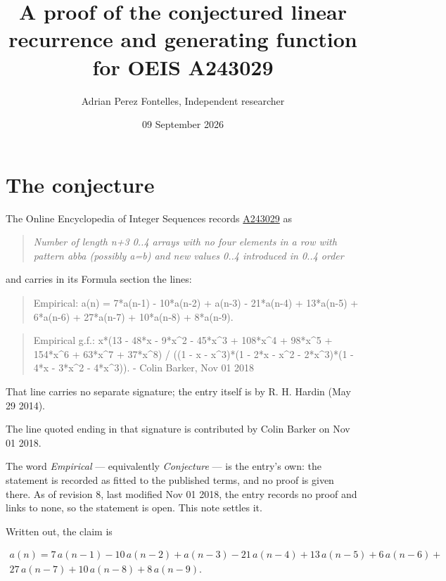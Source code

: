 \documentclass[11pt]{article}
\title{A proof of the conjectured linear recurrence and generating function for OEIS A243029}
\author{Adrian Perez Fontelles, Independent researcher}
\date{09 September 2026}
\theoremstyle{definition}
\begin{document}
\maketitle
\section{The conjecture}

The Online Encyclopedia of Integer Sequences records \href{https://oeis.org/A243029}{A243029} as

\begin{quote}\itshape Number of length n+3 0..4 arrays with no four elements in a row with pattern abba (possibly a=b) and new values 0..4 introduced in 0..4 order\end{quote}

and carries in its Formula section the lines:

\begin{quote}\ttfamily Empirical: a(n) = 7*a(n-1) - 10*a(n-2) + a(n-3) - 21*a(n-4) + 13*a(n-5) + 6*a(n-6) + 27*a(n-7) + 10*a(n-8) + 8*a(n-9).\end{quote}

\begin{quote}\ttfamily Empirical g.f.: x*(13 - 48*x - 9*x\textasciicircum{}2 - 45*x\textasciicircum{}3 + 108*x\textasciicircum{}4 + 98*x\textasciicircum{}5 + 154*x\textasciicircum{}6 + 63*x\textasciicircum{}7 + 37*x\textasciicircum{}8) / ((1 - x - x\textasciicircum{}3)*(1 - 2*x - x\textasciicircum{}2 - 2*x\textasciicircum{}3)*(1 - 4*x - 3*x\textasciicircum{}2 - 4*x\textasciicircum{}3)). - Colin Barker, Nov 01 2018\end{quote}

That line carries no separate signature; the entry itself is by R. H. Hardin (May 29 2014).

The line quoted ending in that signature is contributed by Colin Barker on Nov 01 2018.

The word {\itshape Empirical} --- equivalently {\itshape Conjecture} --- is the entry's own: the statement is recorded as fitted to the published terms, and no proof is given there. As of revision 8, last modified Nov 01 2018, the entry records no proof and links to none, so the statement is open. This note settles it.

Written out, the claim is

\begin{multline*} a(n) = 7\,a(n-1) - 10\,a(n-2) + a(n-3) - 21\,a(n-4) + 13\,a(n-5) + 6\,a(n-6) + \\ 27\,a(n-7) + 10\,a(n-8) + 8\,a(n-9). \end{multline*}
\end{document}
